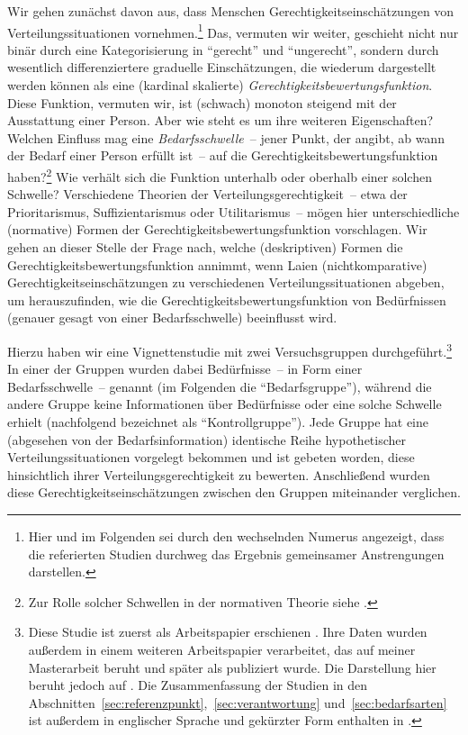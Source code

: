 \documentclass[justified,nobib,symmetric,twoside]{tufte-handout}
\begin{document}
Wir gehen zunächst davon aus, dass Menschen Gerechtigkeitseinschätzungen von Verteilungssituationen vornehmen.\footnote[][-0.6cm]{Hier und im Folgenden sei durch den wechselnden Numerus angezeigt, dass die referierten Studien durchweg das Ergebnis gemeinsamer Anstrengungen darstellen.}
Das, vermuten wir weiter, geschieht nicht nur binär durch eine Kategorisierung in \enquote{gerecht} und \enquote{ungerecht}, sondern durch wesentlich differenziertere graduelle Einschätzungen, die wiederum dargestellt werden können als eine (kardinal skalierte) \textit{Gerechtigkeitsbewertungsfunktion}.
Diese Funktion, vermuten wir, ist (schwach) monoton steigend mit der Ausstattung einer Person.
Aber wie steht es um ihre weiteren Eigenschaften?
Welchen Einfluss mag eine \textit{Bedarfsschwelle}~-- jener Punkt, der angibt, ab wann der Bedarf einer Person erfüllt ist~-- auf die Gerechtigkeitsbewertungsfunktion haben?\footnote{Zur Rolle solcher Schwellen in der normativen Theorie siehe \citet{timmer_thresholds_2021}.}
Wie verhält sich die Funktion unterhalb oder oberhalb einer solchen Schwelle?
Verschiedene Theorien der Verteilungsgerechtigkeit~-- etwa der Prioritarismus, Suffizientarismus oder Utilitarismus~-- mögen hier unterschiedliche (normative) Formen der Gerechtigkeitsbewertungsfunktion vorschlagen.
Wir gehen an dieser Stelle der Frage nach, welche (deskriptiven) Formen die Gerechtigkeitsbewertungsfunktion annimmt, wenn Laien (nichtkomparative) Gerechtigkeitseinschätzungen zu verschiedenen Verteilungs\-situationen abgeben, um herauszufinden, wie die Gerechtigkeitsbewertungsfunktion von Bedürfnissen (genauer gesagt von einer Bedarfsschwelle) beeinflusst wird.

Hierzu haben wir eine Vignettenstudie mit zwei Versuchsgruppen durchgeführt.\footnote{Diese Studie ist zuerst als Arbeitspapier erschienen \citep{weiss_needs_2017}. Ihre Daten wurden außerdem in einem weiteren Arbeitspapier verarbeitet, das auf meiner Masterarbeit beruht \citep{bauer_monotonie_2018} und später als \citet{bauer_grundlegung_2019} publiziert wurde. Die Darstellung hier beruht jedoch auf \citet{bauer_needs_2023}. Die Zusammenfassung der Studien in den Abschnitten~\ref{sec:referenzpunkt},~\ref{sec:verantwortung} und~\ref{sec:bedarfsarten} ist außerdem in englischer Sprache und gekürzter Form enthalten in \citet{siebel_measuring_nd}.}
In einer der Gruppen wurden dabei Bedürfnisse~-- in Form einer Bedarfsschwelle~-- genannt (im Folgenden die \enquote{Bedarfsgruppe}), während die andere Gruppe keine Informationen über Bedürfnisse oder eine solche Schwelle erhielt (nachfolgend bezeichnet als \enquote{Kontrollgruppe}). Jede Gruppe hat eine (abgesehen von der Bedarfsinformation) identische Reihe hypothetischer Verteilungssituationen vorgelegt bekommen und ist gebeten worden, diese hinsichtlich ihrer Verteilungsgerechtigkeit zu bewerten.
Anschließend wurden diese Gerechtigkeitseinschätzungen zwischen den Gruppen miteinander verglichen.
\end{document}
